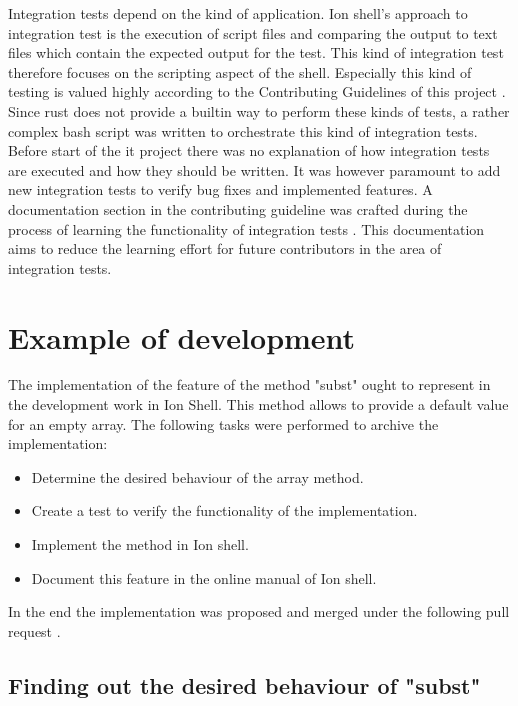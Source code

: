 Integration tests depend on the kind of application.
Ion shell's approach to integration test is the execution of script files
and comparing the output to text files which contain the expected output for the test.
This kind of integration test therefore focuses on the scripting aspect of the shell.
Especially this kind of testing is valued highly according to the Contributing Guidelines of this project \cite{ion_shell_contributing}.
Since rust does not provide a builtin way to perform these kinds of tests,
a rather complex bash script was written to orchestrate this kind of integration tests.
Before start of the it project there was no explanation of how integration tests are executed and how they should be written.
It was however paramount to add new integration tests to verify bug fixes and implemented features.
A documentation section in the contributing guideline was crafted during the process of
learning the functionality of integration tests \cite{ion_shell_contributing}.
This documentation aims to reduce the learning effort for future contributors in the area of integration tests.

\section{Example of development}

The implementation of the feature of the method "subst" ought to represent in the development work in Ion Shell.
This method allows to provide a default value for an empty array.
The following tasks were performed to archive the implementation:

\begin{itemize}
	\item Determine the desired behaviour of the array method.
	\item Create a test to verify the functionality of the implementation.
	\item Implement the method in Ion shell.
	\item Document this feature in the online manual of Ion shell.
\end{itemize}

In the end the implementation was proposed and merged under the following pull request \cite{pr_subst_method}.

\subsection{Finding out the desired behaviour of "subst"}\label{subst_desired_behaviour}

